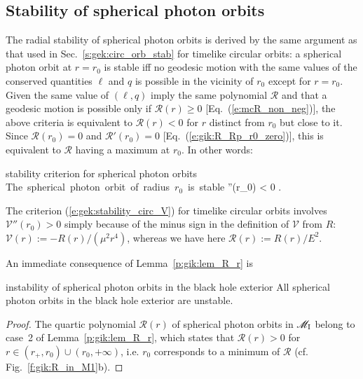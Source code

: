 \subsection{Stability of spherical photon orbits} \label{s:gik:spher_stability}

The radial stability of spherical photon orbits is derived by the same
argument as that used in Sec.~\ref{s:gek:circ_orb_stab} for timelike circular
orbits: a spherical photon orbit at $r=r_0$ is
stable iff no geodesic motion with the same values of the
conserved quantities $\ell$ and $q$
is possible in the vicinity of $r_0$ except for $r=r_0$. Given
the same value of $(\ell,q)$ imply the same polynomial $\mathcal{R}$ and
that a geodesic
motion is possible only if $\mathcal{R}(r) \geq 0$ [Eq.~(\ref{e:mcR_non_neg})],
the above criteria is equivalent to $\mathcal{R}(r) < 0$
for $r$ distinct from $r_0$ but close to it. Since $\mathcal{R}(r_0) = 0$
and $\mathcal{R}'(r_0) = 0$ [Eq.~(\ref{e:gik:R_Rp_r0_zero})], this is equivalent
to $\mathcal{R}$ having a maximum at $r_0$. In other words:
\begin{tprop}{stability criterion for spherical photon orbits}{}
\be \label{e:gik:stability_spher}
    \mbox{The spherical photon orbit of radius $r_0$ is stable} \iff
    ''(r_0) < 0 .
\ee
\end{tprop}

\begin{remark}
The criterion (\ref{e:gek:stability_circ_V}) for timelike circular orbits involves
$\mathcal{V}''(r_0) > 0$ simply because
of the minus sign in the definition of $\mathcal{V}$ from $R$:
$\mathcal{V}(r) := - R(r) / (\mu^2 r^4)$, whereas we have here
$\mathcal{R}(r) := R(r)/E^2$.
\end{remark}

An immediate consequence of Lemma~\ref{p:gik:lem_R_r} is
\begin{tprop}{instability of spherical photon orbits in the black hole exterior}{}
All spherical photon orbits in the black hole exterior are unstable.
\end{tprop}

\begin{proof}
The quartic polynomial $\mathcal{R}(r)$ of spherical photon orbits in $\mathscr{M}_{\rm I}$
belong to case~2 of Lemma~\ref{p:gik:lem_R_r}, which states that $\mathcal{R}(r)>0$ for $r\in (r_+, r_0)\cup(r_0, +\infty)$,
i.e. $r_0$ corresponds to a minimum of $\mathcal{R}$ (cf. Fig.~\ref{f:gik:R_in_M1}b).
\end{proof}

